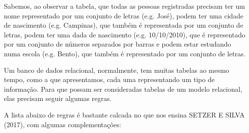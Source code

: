 Sabemos, ao observar a tabela, que todas as pessoas registradas precisam ter um nome representado por um conjunto de letras (e.g. José), podem ter uma cidade de nascimento (e.g. Campinas), que também é representada por um conjunto de letras, podem ter uma dada de nascimento (e.g. 10/10/2010), que é representado por um conjunto de números separados por barras e podem estar estudando numa escola (e.g. Bento), que também é representado por um conjunto de letras.

Um banco de dados relacional, normalmente, tem muitas tabelas ao mesmo tempo, como a que apresentamos, cada uma representando um tipo de informação. Para que possam ser consideradas tabelas de um modelo relacional, elas precisam seguir algumas regras.

A lista abaixo de regras é bastante calcada no que nos ensina  SETZER E SILVA (2017), com algumas complementações:


